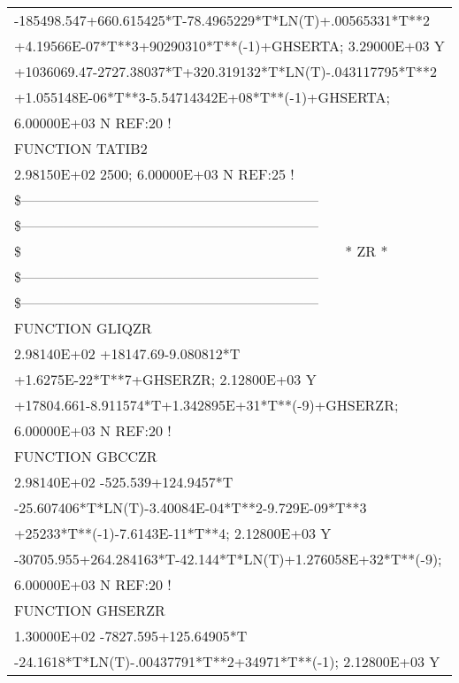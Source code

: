\begin{longtable}[H]{ l l l }
	\multicolumn{3}{l}{-185498.547+660.615425*T-78.4965229*T*LN(T)+.00565331*T**2}\\
	\multicolumn{3}{l}{+4.19566E-07*T**3+90290310*T**(-1)+GHSERTA;  3.29000E+03  Y}\\
	\multicolumn{3}{l}{+1036069.47-2727.38037*T+320.319132*T*LN(T)-.043117795*T**2}\\
	\multicolumn{3}{l}{+1.055148E-06*T**3-5.54714342E+08*T**(-1)+GHSERTA;}\\
	\multicolumn{3}{l}{6.00000E+03  N REF:20 !}\\
	FUNCTION TATIB2 & & \\
	\multicolumn{3}{l}{2.98150E+02  2500;   6.00000E+03  N REF:25 !}\\
	\multicolumn{3}{l}{\$---------------------------------------------------------------}\\
	\multicolumn{3}{l}{\$---------------------------------------------------------------}\\
	\$ & \multicolumn{2}{l}{* ZR *}\\
	\multicolumn{3}{l}{\$---------------------------------------------------------------}\\
	\multicolumn{3}{l}{\$---------------------------------------------------------------}\\
	FUNCTION GLIQZR & & \\
	\multicolumn{3}{l}{2.98140E+02  +18147.69-9.080812*T}\\
	\multicolumn{3}{l}{+1.6275E-22*T**7+GHSERZR;  2.12800E+03  Y}\\
	\multicolumn{3}{l}{+17804.661-8.911574*T+1.342895E+31*T**(-9)+GHSERZR;}\\
	\multicolumn{3}{l}{6.00000E+03  N REF:20 !}\\
	FUNCTION GBCCZR & & \\
	\multicolumn{3}{l}{2.98140E+02  -525.539+124.9457*T}\\
	\multicolumn{3}{l}{-25.607406*T*LN(T)-3.40084E-04*T**2-9.729E-09*T**3}\\
	\multicolumn{3}{l}{+25233*T**(-1)-7.6143E-11*T**4;  2.12800E+03  Y}\\
	\multicolumn{3}{l}{-30705.955+264.284163*T-42.144*T*LN(T)+1.276058E+32*T**(-9);}\\
	\multicolumn{3}{l}{6.00000E+03  N REF:20 !}\\
	FUNCTION GHSERZR & & \\
	\multicolumn{3}{l}{1.30000E+02  -7827.595+125.64905*T}\\
	\multicolumn{3}{l}{-24.1618*T*LN(T)-.00437791*T**2+34971*T**(-1); 2.12800E+03  Y}\\

\end{longtable}
